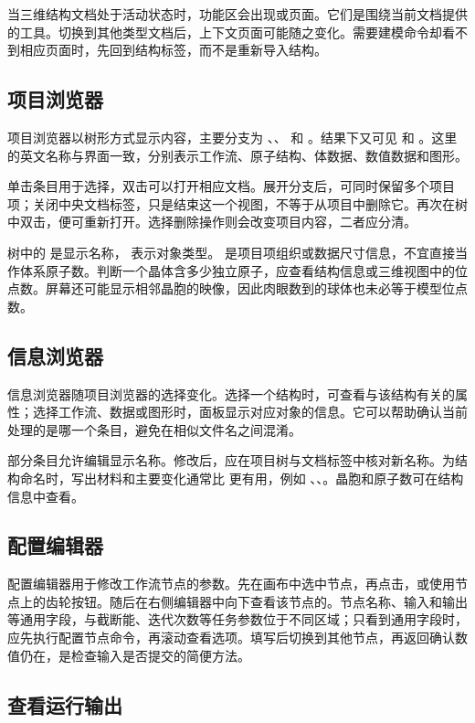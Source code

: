 当三维结构文档处于活动状态时，功能区会出现或页面。它们是围绕当前文档提供的工具。切换到其他类型文档后，上下文页面可能随之变化。需要建模命令却看不到相应页面时，先回到结构标签，而不是重新导入结构。

\subsection{项目浏览器}
项目浏览器以树形方式显示内容，主要分支为 、、 和 。结果下又可见  和 。这里的英文名称与界面一致，分别表示工作流、原子结构、体数据、数值数据和图形。

单击条目用于选择，双击可以打开相应文档。展开分支后，可同时保留多个项目项；关闭中央文档标签，只是结束这一个视图，不等于从项目中删除它。再次在树中双击，便可重新打开。选择删除操作则会改变项目内容，二者应分清。

树中的  是显示名称， 表示对象类型。 是项目项组织或数据尺寸信息，不宜直接当作体系原子数。判断一个晶体含多少独立原子，应查看结构信息或三维视图中的位点数。屏幕还可能显示相邻晶胞的映像，因此肉眼数到的球体也未必等于模型位点数。

\subsection{信息浏览器}
信息浏览器随项目浏览器的选择变化。选择一个结构时，可查看与该结构有关的属性；选择工作流、数据或图形时，面板显示对应对象的信息。它可以帮助确认当前处理的是哪一个条目，避免在相似文件名之间混淆。

部分条目允许编辑显示名称。修改后，应在项目树与文档标签中核对新名称。为结构命名时，写出材料和主要变化通常比  更有用，例如 、、。晶胞和原子数可在结构信息中查看。

\subsection{配置编辑器}
配置编辑器用于修改工作流节点的参数。先在画布中选中节点，再点击，或使用节点上的齿轮按钮。随后在右侧编辑器中向下查看该节点的。节点名称、输入和输出等通用字段，与截断能、迭代次数等任务参数位于不同区域；只看到通用字段时，应先执行配置节点命令，再滚动查看选项。填写后切换到其他节点，再返回确认数值仍在，是检查输入是否提交的简便方法。

\subsection{查看运行输出}

